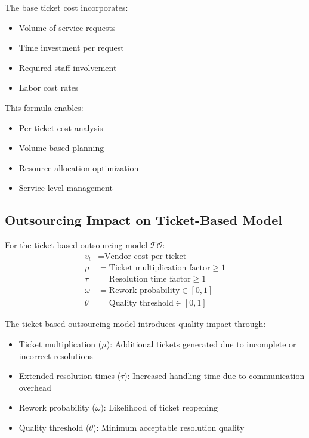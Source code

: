 \documentclass[12pt,a4paper]{article}
\newenvironment{definition}[1]
{\begin{mdframed}[style=definitionstyle,frametitle={Definition: #1}]}
{\end{mdframed}}
\newenvironment{explanation}
{\begin{mdframed}[style=explanationstyle,frametitle={Explanation}]}
{\end{mdframed}}
\begin{document}
\begin{explanation}
The base ticket cost incorporates:
\begin{itemize}
    \item Volume of service requests
    \item Time investment per request
    \item Required staff involvement
    \item Labor cost rates
\end{itemize}

This formula enables:
\begin{itemize}
    \item Per-ticket cost analysis
    \item Volume-based planning
    \item Resource allocation optimization
    \item Service level management
\end{itemize}
\end{explanation}

\subsection{Outsourcing Impact on Ticket-Based Model}
\begin{definition}{Ticket Outsourcing Variables}
For the ticket-based outsourcing model $\mathcal{TO}$:
\begin{align*}
    v_t &= \text{Vendor cost per ticket} \\
    \mu &= \text{Ticket multiplication factor} \geq 1 \\
    \tau &= \text{Resolution time factor} \geq 1 \\
    \omega &= \text{Rework probability} \in [0,1] \\
    \theta &= \text{Quality threshold} \in [0,1]
\end{align*}
\end{definition}

\begin{explanation}
The ticket-based outsourcing model introduces quality impact through:
\begin{itemize}
    \item Ticket multiplication ($\mu$): Additional tickets generated due to incomplete or incorrect resolutions
    \item Extended resolution times ($\tau$): Increased handling time due to communication overhead
    \item Rework probability ($\omega$): Likelihood of ticket reopening
    \item Quality threshold ($\theta$): Minimum acceptable resolution quality
\end{itemize}
\end{explanation}
\end{document}

